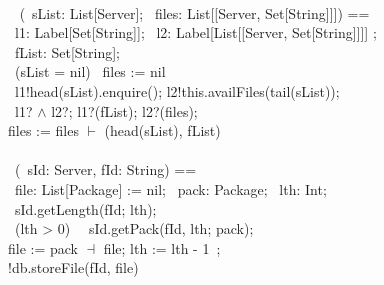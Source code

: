 \documentclass[handout]
{beamer}
\begin{document}
\begin{frame}

\bigskip

\begin{small}
\innrykk  {}\\
\innrykk \innrykk     \OP\  (\IN\ sList: List[Server]; \OUT\ files: List[[Server, Set[String]]]) ==\\
\innrykk \innrykk \innrykk \VAR\ l1: Label[Set[String]]; \VAR\ l2: Label[List[[Server, Set[String]]]] ;\\
\innrykk \innrykk \innrykk \innrykk \VAR\ fList: Set[String];\\
\innrykk \innrykk \innrykk \innrykk \innrykk \IF\ (sList = nil) \THEN\ files := nil\\
\innrykk \innrykk \innrykk \innrykk \innrykk \innrykk \ELSE\ l1!head(sList).enquire(); 
l2!this.availFiles(tail(sList));\\
\innrykk \innrykk \innrykk \innrykk \innrykk \innrykk \innrykk	
\AWAIT\ l1? $\land$ l2?; l1?(fList); l2?(files);\\
\innrykk \innrykk \innrykk \innrykk \innrykk \innrykk \innrykk \innrykk 	
files := files $\vdash$ (head(sList), fList)\ \END\\
\quad \\
\innrykk \innrykk  \OP\ (\IN\ sId: Server, fId: String) ==\\
\innrykk \innrykk \innrykk \VAR\ file: List[Package] := nil; \VAR\ pack: Package; \VAR\ lth: Int;\\
\innrykk \innrykk \innrykk \innrykk \AWAIT\ sId.getLength(fId; lth);\\
\innrykk \innrykk \innrykk \innrykk \innrykk \WHILE\ (lth > 0) \DO\ \AWAIT\ sId.getPack(fId, lth; pack);\\
\innrykk \innrykk \innrykk \innrykk \innrykk \innrykk \innrykk \innrykk \innrykk \innrykk \innrykk \innrykk \innrykk \innrykk \innrykk 
file := pack $\dashv$ file; lth := lth - 1\ \END;\\
\innrykk \innrykk \innrykk \innrykk \innrykk \innrykk !db.storeFile(fId, file)\\
\END
\end{small}
\end{frame}
\end{document}
